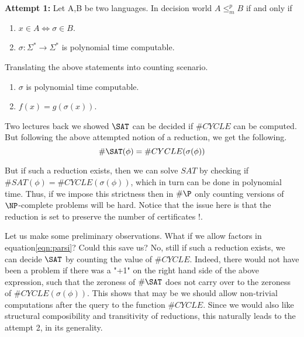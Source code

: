 \begin{description}
\item{\textbf{Attempt 1:}}
	Let A,B be two languages. In decision world $A \leq ^p_m B$ if and only if
	\begin{enumerate}
		\item $x\in A\Longleftrightarrow \sigma\in B$.
		\item $\sigma : \Sigma ^*\rightarrow\Sigma^*$ is polynomial time computable.
	\end{enumerate}
	Translating the above statements into counting scenario.
	\begin{enumerate}
		\item $\sigma$ is polynomial time computable.
		\item $f(x)=g(\sigma(x))$.
	\end{enumerate}
	Two lectures back we showed $\SAT$ can be decided if $\#CYCLE$ can be computed. But following the above attempted notion of a reduction, we get the following.
\begin{equation}
\label{eqn:parsi}
	\#\SAT(\phi)=\#CYCLE(\sigma(\phi))
\end{equation}
	
	But if such a reduction exists, then we can solve $SAT$ by checking if $\#SAT(\phi)=\#CYCLE(\sigma(\phi))$, which in turn can be done in polynomial time. Thus, if we impose this strictness then in $\#\P$ only counting versions of $\NP$-complete problems will be hard. Notice that the issue here is that the reduction is set to preserve the number of certificates !. %
	
	Let us make some preliminary observations. What if we allow factors in equation\ref{eqn:parsi}? Could this save us? No, still if such a reduction exists, we can decide $\SAT$  by counting the value of $\#CYCLE$. Indeed, there would not have been a problem if there was a "+1" on the right hand side of the above expression, such that the zeroness of $\#\SAT$ does not carry over to the zeroness of $\#CYCLE(\sigma(\phi))$. This shows that may be we should allow non-trivial computations after the query to the function $\#CYCLE$. Since we would also like structural composibility and transitivity of reductions, this naturally leads to the attempt 2, in its generality.
	

\end{description}
